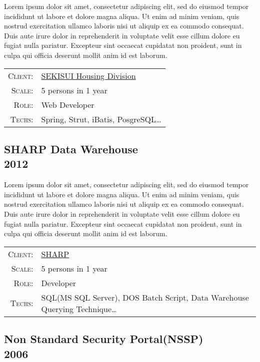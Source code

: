 \documentclass[a4paper,10pt]{article}
\begin{document}
Lorem ipsum dolor sit amet, consectetur adipiscing elit, sed do eiusmod tempor incididunt ut labore et dolore magna aliqua. Ut enim ad minim veniam, quis nostrud exercitation ullamco laboris nisi ut aliquip ex ea commodo consequat. Duis aute irure dolor in reprehenderit in voluptate velit esse cillum dolore eu fugiat nulla pariatur. Excepteur sint occaecat cupidatat non proident, sunt in culpa qui officia deserunt mollit anim id est laborum.

\begin{tabular}{rl}
    \textsc{Client:} & \href{http://www.sekisuichemical.com/about/division/housing/}{SEKISUI Housing Division}\\
    \textsc{Scale:} & 5 persons in 1 year\\
    \textsc{Role:} & Web Developer\\
    \textsc{Techs:} & Spring, Strut, iBatis, PosgreSQL\ldots\\
\end{tabular}

\subsection*{SHARP Data Warehouse\\\small 2012}

Lorem ipsum dolor sit amet, consectetur adipiscing elit, sed do eiusmod tempor incididunt ut labore et dolore magna aliqua. Ut enim ad minim veniam, quis nostrud exercitation ullamco laboris nisi ut aliquip ex ea commodo consequat. Duis aute irure dolor in reprehenderit in voluptate velit esse cillum dolore eu fugiat nulla pariatur. Excepteur sint occaecat cupidatat non proident, sunt in culpa qui officia deserunt mollit anim id est laborum.

\begin{tabular}{rl}
    \textsc{Client:} & \href{http://www.sharp-world.com/}{SHARP}\\
    \textsc{Scale:} & 5 persons in 1 year\\
    \textsc{Role:} & Developer\\
    \textsc{Techs:} & SQL(MS SQL Server), DOS Batch Script, Data Warehouse Querying Technique\ldots\\
\end{tabular}

\subsection*{Non Standard Security Portal(NSSP)\\\small 2006}
\end{document}
